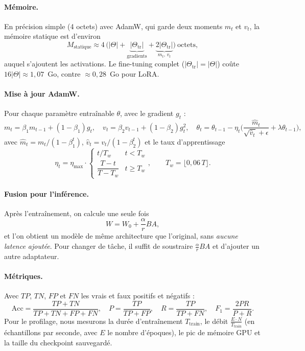 \documentclass[11pt,a4paper]{article}
\begin{document}
\paragraph{Mémoire.} En précision simple (4 octets) avec AdamW, qui garde deux moments $m_t$ et $v_t$, la mémoire statique est d'environ
\begin{equation}
M_{\text{statique}}\approx 4\,\big(|\Theta| + \underbrace{|\Theta_{\text{tr}}|}_{\text{gradients}} + \underbrace{2|\Theta_{\text{tr}}|}_{m_t,\,v_t}\big)\ \text{octets},
\end{equation}
auquel s'ajoutent les activations. Le fine-tuning complet ($|\Theta_{\text{tr}}|=|\Theta|$) coûte $16|\Theta|\approx1{,}07$~Go, contre $\approx0{,}28$~Go pour LoRA.

\paragraph{Mise à jour AdamW.} Pour chaque paramètre entraînable $\theta$, avec le gradient $g_t$ :
\begin{equation}
m_t=\beta_1m_{t-1}+(1-\beta_1)g_t,\quad v_t=\beta_2v_{t-1}+(1-\beta_2)g_t^2,\quad
\theta_t=\theta_{t-1}-\eta_t\Big(\frac{\hat m_t}{\sqrt{\hat v_t}+\epsilon}+\lambda\theta_{t-1}\Big),
\end{equation}
avec $\hat m_t=m_t/(1-\beta_1^t)$, $\hat v_t=v_t/(1-\beta_2^t)$ et le taux d'apprentissage
\begin{equation}
\eta_t=\eta_{\max}\cdot\begin{cases} t/T_w & t<T_w\\[2pt] \dfrac{T-t}{T-T_w} & t\ge T_w\end{cases},\qquad T_w=\lfloor0{,}06\,T\rfloor .
\end{equation}

\paragraph{Fusion pour l'inférence.} Après l'entraînement, on calcule une seule fois
\begin{equation}
W=W_0+\frac{\alpha}{r}BA ,
\end{equation}
et l'on obtient un modèle de même architecture que l'original, sans \emph{aucune latence ajoutée}. Pour changer de tâche, il suffit de soustraire $\frac{\alpha}{r}BA$ et d'ajouter un autre adaptateur.

\paragraph{Métriques.} Avec $TP$, $TN$, $FP$ et $FN$ les vrais et faux positifs et négatifs :
\begin{equation}
\text{Acc}=\frac{TP+TN}{TP+TN+FP+FN},\quad P=\frac{TP}{TP+FP},\quad R=\frac{TP}{TP+FN},\quad F_1=\frac{2PR}{P+R}.
\end{equation}
Pour le profilage, nous mesurons la durée d'entraînement $T_{\text{train}}$, le débit $\frac{E\cdot N}{T_{\text{train}}}$ (en échantillons par seconde, avec $E$ le nombre d'époques), le pic de mémoire GPU et la taille du checkpoint sauvegardé.
\end{document}
